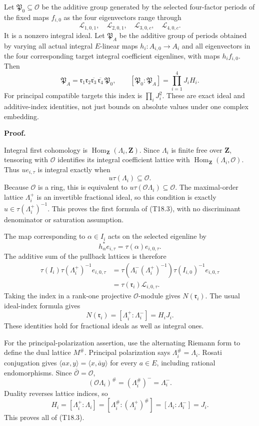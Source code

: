 Let \(\mathfrak P_0\subseteq\mathcal O\) be the additive group generated by the selected four-factor periods of the fixed maps \(f_{i,0}\) as the four eigenvectors range through \[
\mathcal L_{1,0,1},\quad\mathcal L_{2,0,1},\quad
\mathcal L_{3,0,c},\quad\mathcal L_{4,0,c}.
\] It is a nonzero integral ideal. Let \(\mathfrak P_A\) be the additive group of periods obtained by varying all actual integral \(E\)-linear maps \(h_i:A_{i,0}\to A_i\) and all eigenvectors in the four corresponding target integral coefficient eigenlines, with maps \(h_if_{i,0}\). Then \[
\mathfrak P_A
=\mathfrak r_1\mathfrak r_2\overline{\mathfrak r_3}\,
             \overline{\mathfrak r_4}\,\mathfrak P_0,
\qquad
[\mathfrak P_0:\mathfrak P_A]=\prod_{i=1}^4J_iH_i.
\tag{T18.4}
\] For principal compatible targets this index is \(\prod_iJ_i^2\). These are exact ideal and additive-index identities, not just bounds on absolute values under one complex embedding.

\textbf{Proof.}

Integral first cohomology is \(\operatorname{Hom}_{\mathbf Z}(\Lambda_i,\mathbf Z)\). Since \(\Lambda_i\) is finite free over \(\mathbf Z\), tensoring with \(\mathcal O\) identifies its integral coefficient lattice with \(\operatorname{Hom}_{\mathbf Z}(\Lambda_i,\mathcal O)\). Thus \(u e_{i,\tau}\) is integral exactly when \[
u\tau(\Lambda_i)\subseteq\mathcal O.
\] Because \(\mathcal O\) is a ring, this is equivalent to \(u\tau(\mathcal O\Lambda_i)\subseteq\mathcal O\). The maximal-order lattice \(\Lambda_i^+\) is an invertible fractional ideal, so this condition is exactly \(u\in\tau(\Lambda_i^+)^{-1}\). This proves the first formula of (T18.3), with no discriminant denominator or saturation assumption.

The map corresponding to \(\alpha\in I_i\) acts on the selected eigenline by \[
h_\alpha^*e_{i,\tau}=\tau(\alpha)e_{i,0,\tau}.
\] The additive sum of the pullback lattices is therefore \[
\begin{aligned}
\tau(I_i)\tau(\Lambda_i^+)^{-1}e_{i,0,\tau}
&=\tau(\Lambda_i^-(\Lambda_i^+)^{-1})
  \tau(I_{i,0})^{-1}e_{i,0,\tau}\\
&=\tau(\mathfrak r_i)\mathcal L_{i,0,\tau}.
\end{aligned}
\] Taking the index in a rank-one projective \(\mathcal O\)-module gives \(N(\mathfrak r_i)\). The usual ideal-index formula gives \[
N(\mathfrak r_i)=[\Lambda_i^+:\Lambda_i^-]=H_iJ_i.
\] These identities hold for fractional ideals as well as integral ones.

For the principal-polarization assertion, use the alternating Riemann form to define the dual lattice \(M^\#\). Principal polarization says \(\Lambda_i^\#=\Lambda_i\). Rosati conjugation gives \(\langle ax,y\rangle=\langle x,\bar a y\rangle\) for every \(a\in E\), including rational endomorphisms. Since \(\bar{\mathcal O}=\mathcal O\), \[
(\mathcal O\Lambda_i)^\#=(\Lambda_i^\#)^-=\Lambda_i^-.
\] Duality reverses lattice indices, so \[
H_i=[\Lambda_i^+:\Lambda_i]
=[\Lambda_i^\#:(\Lambda_i^+)^\#]
=[\Lambda_i:\Lambda_i^-]=J_i.
\] This proves all of (T18.3).

